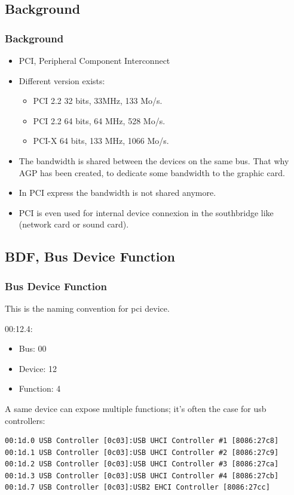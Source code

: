 \subsection*{Background}
\begin{frame}
\frametitle{Background}
\begin{itemize}
\item PCI, Peripheral Component Interconnect
\item Different version exists:
\begin{itemize}
\item PCI 2.2 32 bits, 33MHz, 133 Mo/s.
\item PCI 2.2 64 bits, 64 MHz, 528 Mo/s.
\item PCI-X 64 bits, 133 MHz, 1066 Mo/s.
\end{itemize}
\item The bandwidth is shared between the devices on the same bus. That
why AGP has been created, to dedicate some bandwidth to the graphic
card.
\item In PCI express the bandwidth is not shared anymore. 
\item PCI is even used for internal device connexion in the southbridge like (network card or sound card).
\end{itemize}
\end{frame}

\subsection{BDF, Bus Device Function}
\begin{frame}[fragile]
\frametitle{Bus Device Function}
This is the naming convention for pci device.

\-

00:12.4:
\begin{itemize}
\item Bus: 00
\item Device: 12
\item Function: 4
\end{itemize}

\-

A same device can expose multiple functions; it's often the case for usb controllers:

\begin{verbatim}
00:1d.0 USB Controller [0c03]:USB UHCI Controller #1 [8086:27c8]
00:1d.1 USB Controller [0c03]:USB UHCI Controller #2 [8086:27c9]
00:1d.2 USB Controller [0c03]:USB UHCI Controller #3 [8086:27ca]
00:1d.3 USB Controller [0c03]:USB UHCI Controller #4 [8086:27cb]
00:1d.7 USB Controller [0c03]:USB2 EHCI Controller [8086:27cc]
\end{verbatim}

\end{frame}

